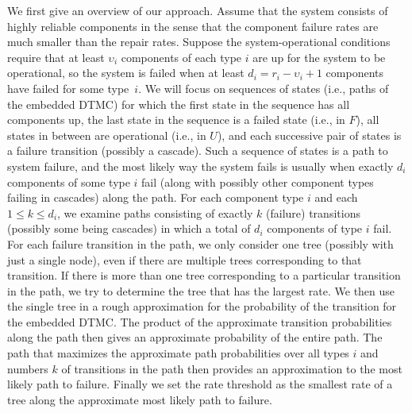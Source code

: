 \documentclass[12pt]{article}
\newcommand{\changed}[1]{#1}
\newcommand{\changed}[1]{\textcolor{red}{#1}}
\begin{document}
\changed{We first give an overview
of our approach.}
Assume that the system consists
of highly reliable components
\cite{GSHNG:1992}
in the sense
that the component
failure rates are much smaller than
the repair rates.
Suppose the system-operational
conditions require that
at least $\upsilon_i$ components
of each type $i$ are up
for the system to be operational,
\changed{so the system is failed
when at least $d_i = r_i - \upsilon_i + 1$
components have failed for some type~$i$.
We will focus on
sequences of states (i.e., paths
of the embedded DTMC)
for which the first state in the
sequence has all components up,
the last state in the sequence is a
failed state (i.e., in $F$),
all states in between are operational
(i.e., in $U$),
and
each successive pair of
states is a failure transition
(possibly a cascade).
Such a sequence of states is a path
to system failure,
and the most likely way the
system fails
is usually
when exactly
$d_i$ components
of some type $i$
fail (along with possibly
other component types failing
in cascades)
along the path.
For each component type $i$
and each $1 \leq k \leq d_i$,
we examine
paths consisting of exactly $k$
(failure) transitions (possibly some
being cascades) in which
a total
of $d_i$ components of type $i$ fail.
For each failure transition in the path,
we only consider one tree (possibly with
just a single node), even if there
are multiple trees corresponding to
that transition.  If there is
more than one tree corresponding to
a particular transition in the path,
we try to determine
the tree that has the largest rate.
We then use the single tree in a rough
approximation for the probability
of the transition for the embedded DTMC.\@
The product of the approximate transition
probabilities along the path then gives
an approximate probability of the entire path.
The path that
maximizes the approximate path probabilities
over all types $i$ and numbers $k$
of transitions in the path then
provides an approximation to the
most likely path to failure.
Finally we set the rate threshold
as the smallest rate
of a tree along the approximate most
likely path to failure.}
\end{document}
